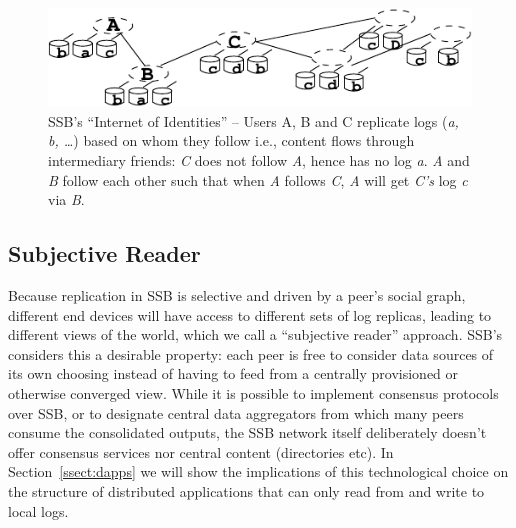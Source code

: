 \documentclass[9pt,sigconf,rewiew]{acmart}
\begin{document}
\begin{figure}[htb]
  \includegraphics[width=0.9\columnwidth]{figs/net-of-people.pdf}
  \caption{SSB's ``Internet of Identities'' -- {\rm\small Users A, B and C
    replicate logs ({\em a, b, \ldots}) based on whom they follow i.e., content
    flows through intermediary friends: {\em C} does not follow {\em A}, hence has no log {\em a}. {\em A} and {\em B} follow each other such that when {\em A} follows {\em C}, {\em A} will get {\em C's} log {\em c} via {\em B}.}\label{fig:net-of-people}}
\end{figure}


\subsection*{Subjective Reader}

Because replication in SSB is selective and driven by a peer's
social graph, different end devices will have access to different sets
of log replicas, leading to different views of the world, which we call
a ``subjective reader'' approach. SSB's considers this a desirable
property: each peer is free to
consider data sources of its own choosing instead of having to feed
from a centrally provisioned or otherwise converged view. While it is
possible to implement consensus protocols over SSB, or to designate
central data aggregators from which many peers consume the
consolidated outputs, the SSB network itself deliberately doesn't
offer consensus services nor central content (directories etc). In
Section~\ref{ssect:dapps} we will show the implications of this
technological choice on the structure of distributed applications that
can only read from and write to local logs.
\end{document}
